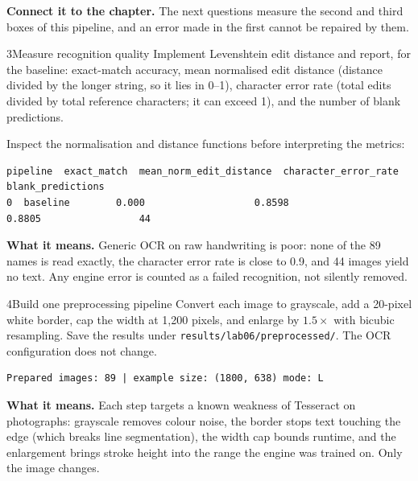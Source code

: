 \textbf{Connect it to the chapter.} The next questions measure the second and third boxes of this pipeline, and an error made in the first cannot be repaired by them.


\begin{labquestion}{3}{Measure recognition quality}
Implement Levenshtein edit distance and report, for the baseline: exact-match accuracy, mean normalised edit distance (distance divided by the longer string, so it lies in 0--1), character error rate (total edits divided by total reference characters; it can exceed 1), and the number of blank predictions.
\end{labquestion}
\begin{labanswer}
Inspect the normalisation and distance functions before interpreting the metrics:



\begin{refoutput}
\begin{lstlisting}[style=utpterminal]
   pipeline  exact_match  mean_norm_edit_distance  character_error_rate  blank_predictions
0  baseline        0.000                   0.8598                0.8805                 44
\end{lstlisting}
\end{refoutput}

\textbf{What it means.} Generic OCR on raw handwriting is poor: none of the 89 names is read exactly, the character error rate is close to 0.9, and 44 images yield no text. Any engine error is counted as a failed recognition, not silently removed.
\end{labanswer}

\begin{labquestion}{4}{Build one preprocessing pipeline}
Convert each image to grayscale, add a 20-pixel white border, cap the width at 1,200 pixels, and enlarge by $1.5\times$ with bicubic resampling. Save the results under \texttt{results/lab06/preprocessed/}. The OCR configuration does not change.
\end{labquestion}
\begin{labanswer}

\begin{refoutput}
\begin{lstlisting}[style=utpterminal]
Prepared images: 89 | example size: (1800, 638) mode: L
\end{lstlisting}
\end{refoutput}

\textbf{What it means.} Each step targets a known weakness of Tesseract on photographs: grayscale removes colour noise, the border stops text touching the edge (which breaks line segmentation), the width cap bounds runtime, and the enlargement brings stroke height into the range the engine was trained on. Only the image changes.
\end{labanswer}

